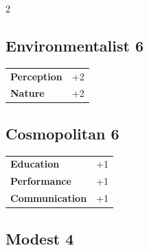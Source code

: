 \begin{multicols}{2}
\begin{tcolorbox}
\end{tcolorbox}

\begin{tcolorbox}
    \subsection*{Environmentalist \hfill \small{6 }}
    \tcblower




\begin{tabular}{@{}ll@{}}
    \textbf{Perception} & +2\\
    \textbf{Nature} & +2\\
\end{tabular}


\end{tcolorbox}

\begin{tcolorbox}
    \subsection*{Cosmopolitan \hfill \small{6 }}
    \tcblower




\begin{tabular}{@{}ll@{}}
    \textbf{Education} & +1\\
    \textbf{Performance} & +1\\
    \textbf{Communication} & +1\\
\end{tabular}


\end{tcolorbox}

\begin{tcolorbox}
    \subsection*{Modest \hfill \small{4 }}
    \tcblower





\end{tcolorbox}
\end{multicols}
